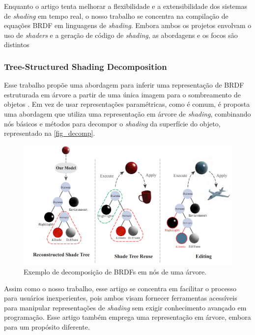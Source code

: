 Enquanto o artigo tenta melhorar a flexibilidade e a extensibilidade dos sistemas de \textit{shading} em tempo real, o nosso trabalho se concentra na compilação de equações BRDF em linguagens de \textit{shading}. Embora ambos os projetos envolvam o uso de \textit{shaders} e a geração de código de \textit{shading}, as abordagens e os focos são distintos


\subsubsection{Tree-Structured Shading Decomposition}


Esse trabalho propõe uma abordagem para inferir uma representação de BRDF estruturada em árvore a partir de uma única imagem para o sombreamento de objetos \cite{tree_decomposition}. Em vez de usar representações paramétricas, como é comum, é proposta uma abordagem que utiliza uma representação em árvore de \textit{shading}, combinando nós básicos e métodos para decompor o \textit{shading} da superfície do objeto, representado na \autoref{fig_decomp}.


\begin{figure}[H]
        \caption{\label{fig_decomp} \small Exemplo de decomposição de BRDFs em nós de uma árvore.}
        \begin{center}
            \includegraphics[scale=0.5]{./Imagens/tree-shading.png}
        \end{center}
\end{figure}




Assim como o nosso trabalho, esse artigo se concentra em facilitar o processo para usuários inexperientes, pois ambos visam fornecer ferramentas acessíveis para manipular representações de \textit{shading} sem exigir conhecimento avançado em programação. Esse artigo também emprega uma representação em árvore, embora para um propósito diferente.



